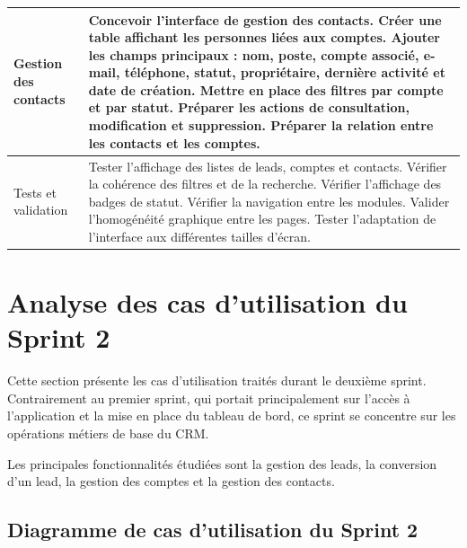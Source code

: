 \documentclass[12pt,a4paper]{report}
\begin{document}
\begin{table}[h]
{\begin{tabular}{|p{4cm}|p{10.5cm}|}
Gestion des contacts
&
Concevoir l’interface de gestion des contacts. \newline
Créer une table affichant les personnes liées aux comptes. \newline
Ajouter les champs principaux : nom, poste, compte associé, e-mail, téléphone, statut, propriétaire, dernière activité et date de création. \newline
Mettre en place des filtres par compte et par statut. \newline
Préparer les actions de consultation, modification et suppression. \newline
Préparer la relation entre les contacts et les comptes. \\
\hline

Tests et validation
&
Tester l’affichage des listes de leads, comptes et contacts. \newline
Vérifier la cohérence des filtres et de la recherche. \newline
Vérifier l’affichage des badges de statut. \newline
Vérifier la navigation entre les modules. \newline
Valider l’homogénéité graphique entre les pages. \newline
Tester l’adaptation de l’interface aux différentes tailles d’écran. \\
\hline

\end{tabular}
}
\end{table}

\section{Analyse des cas d’utilisation du Sprint 2}

Cette section présente les cas d’utilisation traités durant le deuxième sprint. Contrairement au premier sprint, qui portait principalement sur l’accès à l’application et la mise en place du tableau de bord, ce sprint se concentre sur les opérations métiers de base du CRM.

Les principales fonctionnalités étudiées sont la gestion des leads, la conversion d’un lead, la gestion des comptes et la gestion des contacts.

\subsection{Diagramme de cas d’utilisation du Sprint 2}
\end{document}
